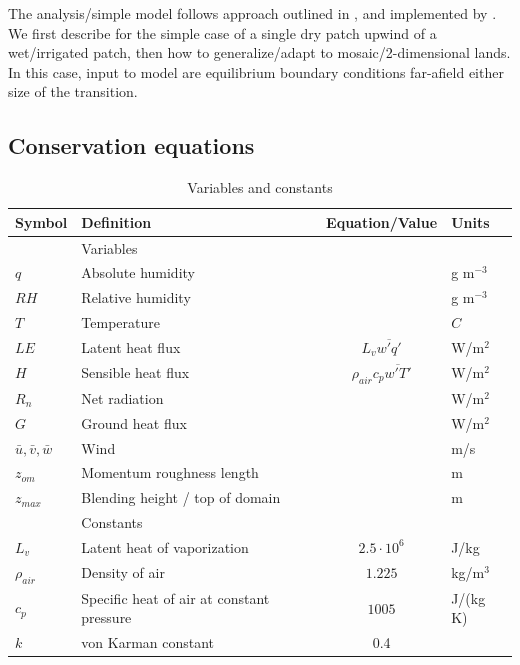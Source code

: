 \documentclass{article}
\begin{document}
    The analysis/simple model follows approach outlined in \citet{brutsaert2013evaporation}, and implemented by \citet{higgins2013measured}.   
    We first describe for the simple case of a single dry patch upwind of a wet/irrigated patch, then how to generalize/adapt to mosaic/2-dimensional lands.
    In this case, input to model are equilibrium boundary conditions far-afield either size of the transition. 
    
    \subsection{Conservation equations}  
    
    \begin{table}
    \renewcommand{\arraystretch}{1.3} 
    \caption{Variables and constants}
    \centering
    \begin{tabular}{lp{6cm}cl}
    \hline
    \textbf{Symbol} & \textbf{Definition} & \textbf{Equation/Value} & \textbf{Units} \\
    \hline
    & Variables &  & \\
    \hline
    $q$ & Absolute humidity &  &  g m$^{-3}$ \\
    $RH$ & Relative humidity &  &  g m$^{-3}$ \\
    $T$ & Temperature &  &  $C$ \\
    $LE$ & Latent heat flux & $L_v \overline{w'q'}$ & W/m$^2$  \\
    $H$ & Sensible heat flux & $\rho_{air} c_p \overline{w'T'}$ & W/m$^2$ \\
    $R_n$ & Net radiation &   & W/m$^2$ \\
    $G$ & Ground heat flux &   & W/m$^2$ \\
    $\bar{u}, \bar{v}, \bar{w}$ & Wind &   & m/s \\
    $z_{om}$ & Momentum roughness length &  & m \\
    $z_{max}$& Blending height / top of domain &  & m \\
    \hline
    & Constants &  & \\
    \hline
    $L_v$ & Latent heat of vaporization & $2.5 \cdot 10^6$ & J/kg \\
    $\rho_{air}$ & Density of air & $1.225$ & kg/m$^3$ \\
    $c_p$ & Specific heat of air at constant pressure & $1005$ & J/(kg K) \\
    $k$ & von Karman constant   & 0.4 &  \\
    \hline
    \end{tabular}
    \end{table}
    
\end{document}
